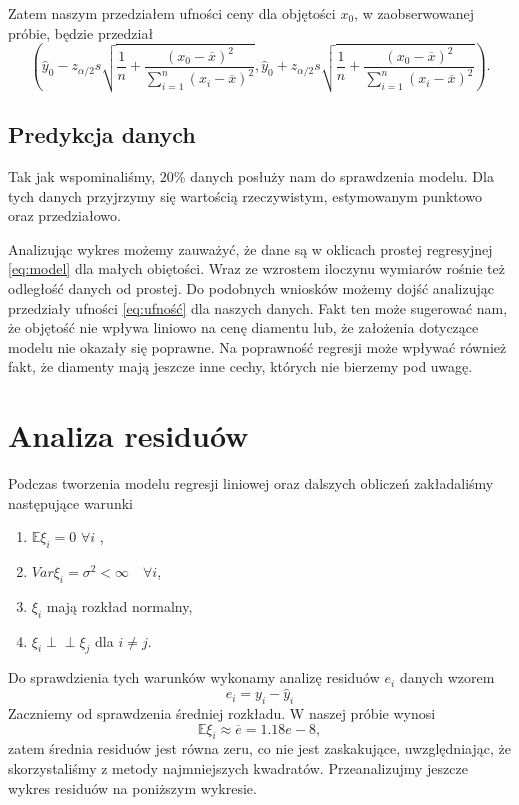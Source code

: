 \documentclass[12pt]{article}
\theoremstyle{exer}
\begin{document}
	\noindent Zatem naszym przedziałem ufności ceny dla objętości $x_0$, w zaobserwowanej próbie, będzie przedział
	\begin{equation}\label{eq:ufność}
		\left(\hat y_0 - 	z_{\alpha/2}s\sqrt{\frac{1}{n}+\frac{\left(x_0-\overline{x}\right)^2}{\sum_{i=1}^n\left(x_i-\overline{x}\right)^2}}, \hat y_0 + z_{\alpha/2}s\sqrt{\frac{1}{n}+\frac{\left(x_0-\overline{x}\right)^2}{\sum_{i=1}^n\left(x_i-\overline{x}\right)^2}}\right).
	\end{equation}
     
     \subsection{Predykcja danych}
     Tak jak wspominaliśmy, $ 20\% $ danych posłuży nam do sprawdzenia modelu. Dla tych danych przyjrzymy się wartością rzeczywistym, estymowanym punktowo oraz przedziałowo.
     

Analizując wykres możemy zauważyć, że dane są w oklicach prostej regresyjnej \eqref{eq:model} dla małych obiętości. Wraz ze wzrostem iloczynu wymiarów rośnie też odległość danych od prostej. Do podobnych wniosków możemy dojść analizując przedziały ufności \eqref{eq:ufność} dla naszych danych. Fakt ten może sugerować nam, że objętość nie wpływa liniowo na cenę diamentu lub, że założenia dotyczące modelu nie okazały się poprawne.
Na poprawność regresji może wpływać również fakt, że diamenty mają jeszcze inne cechy, których nie bierzemy pod uwagę.
 \section{Analiza residuów}
 	Podczas tworzenia modelu regresji liniowej oraz dalszych obliczeń zakładaliśmy następujące warunki
 	\begin{enumerate}
 		\item $\mathbb{E}\xi_i=0$ $\forall i$ ,
 		\item $Var\xi_i=\sigma^2<\infty\quad\forall i$,
 		\item $\xi_i$ mają rozkład normalny,
 		\item $\xi_i\perp\!\!\!\perp\xi_j$ dla $i\neq j$.
 	\end{enumerate}
 	Do sprawdzienia tych warunków wykonamy analizę residuów $e_i$ danych wzorem
 	\begin{equation}
 		e_i=y_i-\hat y_i
 	\end{equation}
    Zaczniemy od sprawdzenia średniej rozkładu. W naszej próbie wynosi
	\begin{equation}
		\mathbb{E}\xi_i\approx\overline{e}=1.18e-8,
	\end{equation}
	zatem średnia residuów jest równa zeru, co nie jest zaskakujące, uwzględniając, że skorzystaliśmy z metody najmniejszych kwadratów. Przeanalizujmy jeszcze wykres residuów na poniższym wykresie.
	
\end{document}
